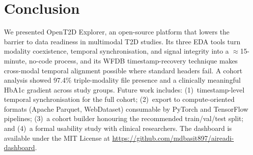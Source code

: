 \documentclass[conference]{IEEEtran}
\begin{document}
\begin{table}[htbp]
    \centering
    \caption{Site $\times$ Study-Group Stratified ECG and CGM File Presence}
    \label{tab:study_group}
\end{table}

\section{Conclusion}
We presented OpenT2D Explorer, an open-source platform that lowers the barrier to data readiness in multimodal T2D studies. Its three EDA tools turn modality coexistence, temporal synchronisation, and signal integrity into a $\approx$15-minute, no-code process, and its WFDB timestamp-recovery technique makes cross-modal temporal alignment possible where standard headers fail. A cohort analysis showed 97.4\% triple-modality file presence and a clinically meaningful HbA1c gradient across study groups. Future work includes: (1)~timestamp-level temporal synchronisation for the full cohort; (2)~export to compute-oriented formats (Apache Parquet, WebDataset) consumable by PyTorch and TensorFlow pipelines; (3)~a cohort builder honouring the recommended train/val/test split; and (4)~a formal usability study with clinical researchers. The dashboard is available under the MIT License at \url{https://github.com/mdbasit897/aireadi-dashboard}.
\end{document}
